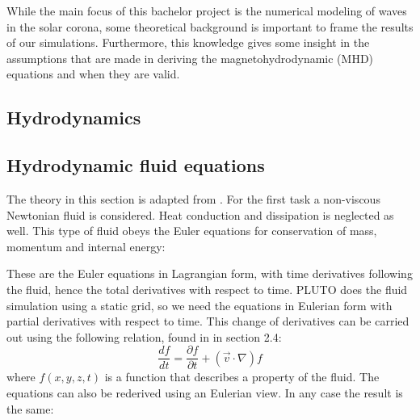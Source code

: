 

While the main focus of this bachelor project is the numerical modeling of waves in the solar corona, some theoretical background is important to frame the results of our simulations.
Furthermore, this knowledge gives some insight in the assumptions that are made in deriving the magnetohydrodynamic (MHD) equations and when they are valid.

\subsection*{Hydrodynamics}

\subsection{Hydrodynamic fluid equations}
The theory in this section is adapted from \cite{notes-fluid-dynamics}. For the first task a non-viscous Newtonian fluid is considered. Heat conduction and dissipation is neglected as well.
This type of fluid obeys the Euler equations for conservation of mass, momentum and internal energy:

{\centering
\noindent {}\par}


These are the Euler equations in Lagrangian form, with time derivatives following the fluid, hence the total derivatives with respect to time.
PLUTO does the fluid simulation using a static grid, so we need the equations in Eulerian form with partial derivatives with respect to time.
This change of derivatives can be carried out using the following relation, found in \cite{notes-fluid-dynamics} in section 2.4:
\begin{equation}
	\frac{df}{dt} = \frac{\partial f}{\partial t} + (\vec{v} \cdot \nabla) f
	\label{eq:relation-total-partial}
\end{equation}
where $f(x,y,z,t)$ is a function that describes a property of the fluid. The equations can also be rederived using an Eulerian view. In any case the result is the same:

